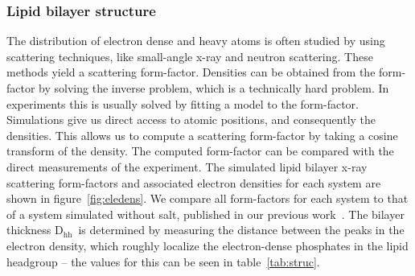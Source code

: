 \documentclass[journal=langd5,manuscript=article]{achemso}
\newcommand{\dhh}{$\text{D}_\text{hh}$}
\begin{document}
\subsubsection{Lipid bilayer structure}
The distribution of electron dense and heavy atoms is often studied by using
scattering techniques, like small-angle x-ray and neutron scattering. 
These methods
yield a scattering form-factor.  Densities can be obtained from the form-factor by solving
the inverse problem, which is a technically hard problem. In experiments this is usually solved by fitting a model to the form-factor.
Simulations give us direct access to atomic positions, and consequently
the densities. This allows us to compute a scattering form-factor by taking a cosine transform of the density{. The computed
form-factor}
can be compared with the direct measurements of the experiment.
The simulated lipid bilayer x-ray scattering form-factors and associated 
electron densities for each system are shown in figure~\ref{fig:eledens}.
We compare all form-factors for each system to that of a system simulated without salt, published
in our previous work~\cite{kruczek:2017}.
The bilayer thickness \dhh~is determined by measuring the distance between the
peaks in the electron density, which roughly localize the electron-dense phosphates in the
lipid headgroup -- the values for this can be seen in table~\ref{tab:struc}.
\end{document}
